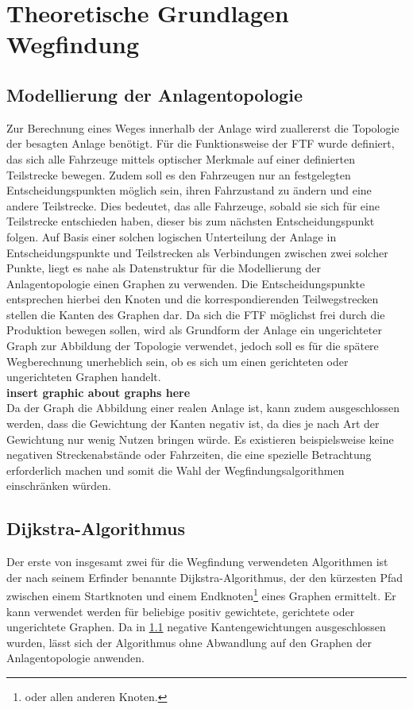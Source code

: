 \chapter{Theoretische Grundlagen Wegfindung}

\section{Modellierung der Anlagentopologie}
	\label{Graph_Anlage}
	Zur Berechnung eines Weges innerhalb der Anlage wird zuallererst die Topologie der besagten Anlage benötigt. Für die Funktionsweise der \ac{FTF} wurde definiert, das sich alle Fahrzeuge mittels optischer Merkmale auf einer definierten Teilstrecke bewegen. Zudem soll es den Fahrzeugen nur an festgelegten Entscheidungspunkten möglich sein, ihren Fahrzustand zu ändern und eine andere Teilstrecke. Dies bedeutet, das alle Fahrzeuge, sobald sie sich für eine Teilstrecke entschieden haben, dieser bis zum nächsten Entscheidungspunkt folgen. Auf Basis einer solchen logischen Unterteilung der Anlage in Entscheidungspunkte und Teilstrecken als Verbindungen zwischen zwei solcher Punkte, liegt es nahe als Datenstruktur für die Modellierung der Anlagentopologie einen Graphen zu verwenden. Die Entscheidungspunkte entsprechen hierbei den Knoten und die korrespondierenden Teilwegstrecken stellen die Kanten des Graphen dar. Da sich die \ac{FTF} möglichst frei durch die Produktion bewegen sollen, wird als Grundform der Anlage ein ungerichteter Graph zur Abbildung der Topologie verwendet, jedoch soll es für die spätere Wegberechnung unerheblich sein, ob es sich um einen gerichteten oder ungerichteten Graphen handelt.\\
	\textbf{insert graphic about graphs here}\\
	Da der Graph die Abbildung einer realen Anlage ist, kann zudem ausgeschlossen werden, dass die Gewichtung der Kanten negativ ist, da dies je nach Art der Gewichtung nur wenig Nutzen bringen würde. Es existieren beispielsweise keine negativen Streckenabstände oder Fahrzeiten, die eine spezielle Betrachtung erforderlich machen und somit die Wahl der Wegfindungsalgorithmen einschränken würden.
\section{Dijkstra-Algorithmus}
	Der erste von insgesamt zwei für die Wegfindung verwendeten Algorithmen ist der nach seinem Erfinder benannte Dijkstra-Algorithmus, der den kürzesten Pfad zwischen einem Startknoten und einem Endknoten\footnote{oder allen anderen Knoten.} eines Graphen ermittelt. Er kann verwendet werden für beliebige positiv gewichtete, gerichtete oder ungerichtete Graphen. Da in \ref{Graph_Anlage} negative Kantengewichtungen ausgeschlossen wurden, lässt sich der Algorithmus ohne Abwandlung auf den Graphen der Anlagentopologie anwenden.
